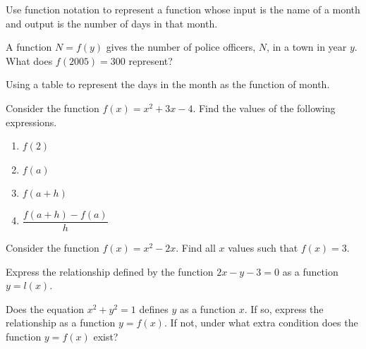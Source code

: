 \begin{example}
  Use function notation to represent a function whose input is the name of a month and output is the number of days in that month.
\end{example}

\newpage


\begin{example}
  A function \(N=f(y)\) gives the number of police officers, \(N\), in a town in year \(y\). What does \(f(2005)=300\) represent?
\end{example}


\begin{example}
  Using a table to represent the days in the month as the function of month.
\end{example}

\begin{example}
  Consider the function $f(x)=x^2+3x-4$. Find the values of the following expressions.

\begin{enumerate}[fourcol]
  \item \(f(2)\)
  \item \(f(a)\)
  \item \(f(a+h)\)
  \item \(\dfrac{f(a+h)-f(a)}{h}\)
\end{enumerate}
\end{example}

\begin{example}
  Consider the function $f(x)=x^2-2x$. Find all $x$ values such that $f(x)=3$.
\end{example}

\newpage

\begin{example}
  Express the relationship defined by the function $2x-y-3=0$ as a function $y=l(x)$.
\end{example}


\begin{example}
  Does the equation \(x^2+y^2=1\) defines $y$ as a function $x$. If so, express the relationship as a function \(y=f(x)\). If not, under what extra condition does the function $y=f(x)$ exist? 
\end{example}


